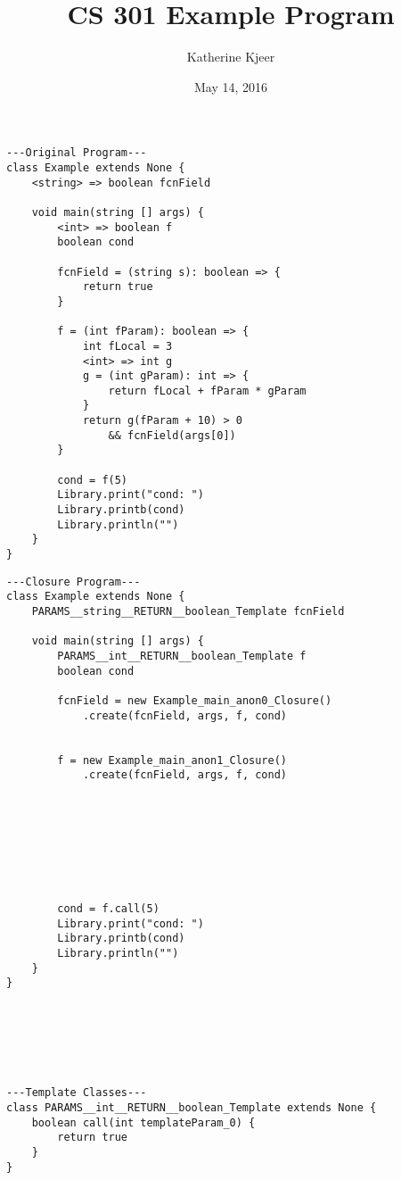 \documentclass{article}
\title{CS 301 Example Program}
\author{Katherine Kjeer}
\date{May 14, 2016}
\begin{document}
\maketitle
\begin{minipage}{0.425\textwidth}
\begin{verbatim}
---Original Program---
class Example extends None {
    <string> => boolean fcnField
    
    void main(string [] args) {
        <int> => boolean f
        boolean cond
        
        fcnField = (string s): boolean => {
            return true
        }
        
        f = (int fParam): boolean => {
            int fLocal = 3
            <int> => int g
            g = (int gParam): int => {
                return fLocal + fParam * gParam
            }
            return g(fParam + 10) > 0 
                && fcnField(args[0])
        }
        
        cond = f(5)
        Library.print("cond: ")
        Library.printb(cond)
        Library.println("")
    }
}
\end{verbatim}
\end{minipage}%
\hfill
\begin{minipage}{0.475\textwidth}
\begin{verbatim}
---Closure Program---
class Example extends None {
    PARAMS__string__RETURN__boolean_Template fcnField
    
    void main(string [] args) {
        PARAMS__int__RETURN__boolean_Template f
        boolean cond
        
        fcnField = new Example_main_anon0_Closure()
            .create(fcnField, args, f, cond)
            
            
        f = new Example_main_anon1_Closure()
            .create(fcnField, args, f, cond)
            






            
        cond = f.call(5)
        Library.print("cond: ")
        Library.printb(cond)
        Library.println("")
    }
}
\end{verbatim}
\end{minipage}%
\\\\\\\
\begin{verbatim}
---Template Classes---
class PARAMS__int__RETURN__boolean_Template extends None {
    boolean call(int templateParam_0) {
        return true
    }
}
\end{verbatim}
\end{document}
